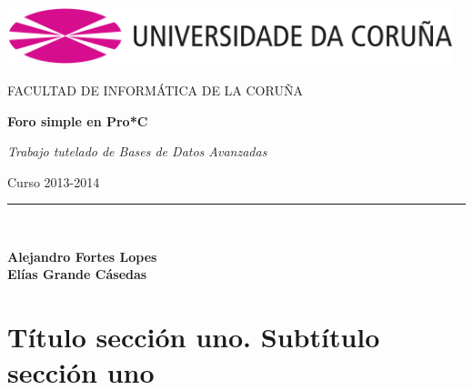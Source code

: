 \documentclass[12pt, a4paper, titlepage]{article}
\newcommand\fancysection[2]{
	\pagebreak
	\section{#1. #2}
	\renewcommand\leftmark{#1}
	\renewcommand\rightmark{#2}
}
\begin{document}
\begin{titlepage}

\begin{center}

\includegraphics[width=13cm]{./img/logo_UDC.png}
\vspace*{0.5in}

FACULTAD DE INFORMÁTICA DE LA CORUÑA\\
\vspace*{2.5in}

\begin{Large}
\textbf{Foro simple en Pro*C} \\
\end{Large}
\vspace*{0.1in}

\begin{large}
\textit{Trabajo tutelado de Bases de Datos Avanzadas} \\
\end{large}
\vspace*{0.4in}

\begin{large}
Curso 2013-2014
\end{large}
\vspace*{3.4in}


\rule{80mm}{0.1mm}\\
\vspace*{0.25in}

\begin{large}
\textbf{Alejandro Fortes Lopes}\\
\textbf{Elías Grande Cásedas}\\
\end{large}

\end{center}

\end{titlepage}

\tableofcontents

\pagestyle{fancy}

\fancysection{Título sección uno}{Subtítulo sección uno}
\end{document}
